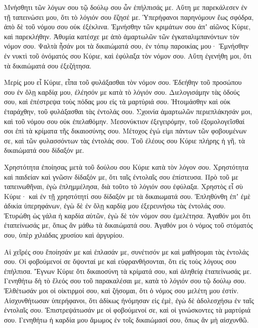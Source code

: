 \begin{spacing}{1.1}
\begin{multicols}{2}
Μνήσθητι τῶν λόγων σου τῷ δούλῳ σου ὧν ἐπήλπισάς με.
Αὕτη με παρεκάλεσεν ἐν τῇ ταπεινώσει μου, ὅτι τὸ λόγιόν σου ἔζησέ με.
Ὑπερήφανοι παρηνόμουν ἕως σφόδρα, ἀπὸ δὲ τοῦ νόμου σου οὐκ ἐξέκλινα.
Ἐμνήσθην τῶν κριμάτων σου ἀπʼ αἰῶνος Κύριε, καὶ παρεκλήθην.
Ἀθυμία κατέσχε με ἀπὸ ἁμαρτωλῶν τῶν ἐγκαταλιμπανόντων τὸν νόμον σου.
Ψαλτὰ ἦσάν μοι τὰ δικαιώματά σου, ἐν τόπῳ παροικίας μου·
Ἐμνήσθην ἐν νυκτὶ τοῦ ὀνόματός σου Κύριε, καὶ ἐφύλαξα τὸν νόμον σου.
Αὕτη ἐγενήθη μοι, ὅτι τὰ δικαιώματά σου ἐξεζήτησα.

Μερίς μου εἶ Κύριε, εἶπα τοῦ φυλάξασθαι τὸν νόμον σου.
Ἐδεήθην τοῦ προσώπου σου ἐν ὅλῃ καρδίᾳ μου, ἐλέησόν με κατὰ τὸ λόγιόν σου.
Διελογισάμην τὰς ὁδούς σου, καὶ ἐπέστρεψα τοὺς πόδας μου εἰς τὰ μαρτύριά σου.
Ἡτοιμάσθην καὶ οὐκ ἐταράχθην, τοῦ φυλάξασθαι τὰς ἐντολάς σου.
Σχοινία ἁμαρτωλῶν περιεπλάκησάν μοι, καὶ τοῦ νόμου σου οὐκ ἐπελαθόμην.
Μεσονύκτιον ἐξεγειρόμην, τοῦ ἐξομολογεῖσθαί σοι ἐπὶ τὰ κρίματα τῆς δικαιοσύνης σου.
Μέτοχος ἐγώ εἰμι πάντων τῶν φοβουμένων σε, καὶ τῶν φυλασσόντων τὰς ἐντολάς σου.
Τοῦ ἐλέους σου Κύριε πλήρης ἡ γῆ, τὰ δικαιώματά σου δίδαξόν με.

Χρηστότητα ἐποίησας μετὰ τοῦ δούλου σου Κύριε κατὰ τὸν λόγον σου.
Χρηστότητα καὶ παιδείαν καὶ γνῶσιν δίδαξόν με, ὅτι ταῖς ἐντολαῖς σου ἐπίστευσα.
Πρὸ τοῦ με ταπεινωθῆναι, ἐγὼ ἐπλημμέλησα, διὰ τοῦτο τὸ λόγιόν σου ἐφύλαξα.
Χρηστὸς εἶ σὺ Κύριε· καὶ ἐν τῇ χρηστότητί σου δίδαξόν με τὰ δικαιωματά σου.
Ἐπληθύνθη ἐπʼ ἐμὲ ἀδικία ὑπερηφάνων, ἐγὼ δὲ ἐν ὅλῃ καρδίᾳ μου ἐξερευνήσω τὰς ἐντολάς σου.
Ἐτυρώθη ὡς γάλα ἡ καρδία αὐτῶν, ἐγὼ δὲ τὸν νόμον σου ἐμελέτησα.
Ἀγαθόν μοι ὅτι ἐταπείνωσάς με, ὅπως ἂν μάθω τὰ δικαιώματά σου.
Ἀγαθόν μοι ὁ νόμος τοῦ στόματός σου, ὑπὲρ χιλιάδας χρυσίου καὶ ἀργυρίου.

Αἱ χεῖρές σου ἔποίησάν με καὶ ἐπλασάν με, συνέτισόν με καὶ μαθήσομαι τὰς ἐντολάς σου.
Οἱ φοβούμενοί σε ὄψονταί με καὶ εὐφρανθήσονται, ὅτι εἰς τοὺς λόγους σου ἐπήλπισα.
Ἔγνων Κύριε ὅτι δικαιοσύνη τὰ κρίματά σου, καὶ ἀληθείᾳ ἐταπείνωσάς με.
Γενηθήτω δὴ τὸ ἔλεός σου τοῦ παρακαλέσαι με, κατὰ τὸ λόγιόν σου τῷ δούλῳ σου.
Ἐλθέτωσάν μοι οἱ οἰκτιρμοί σου, καὶ ζήσομαι, ὅτι ὁ νόμος σου μελέτη μου ἐστίν.
Αἰσχυνθήτωσαν ὑπερήφανοι, ὅτι ἀδίκως ἠνόμησαν εἰς ἐμὲ, ἐγὼ δὲ ἀδολεσχήσω ἐν ταῖς ἐντολαῖς σου.
Ἐπιστρεψάτωσάν με οἱ φοβούμενοί σε, καὶ οἱ γινώσκοντες τὰ μαρτύριά σου.
Γενηθήτω ἡ καρδία μου ἄμωμος ἐν τοῖς δικαιώμασί σου, ὅπως ἂν μὴ αἰσχυνθῶ.


\end{multicols}
\end{spacing}
